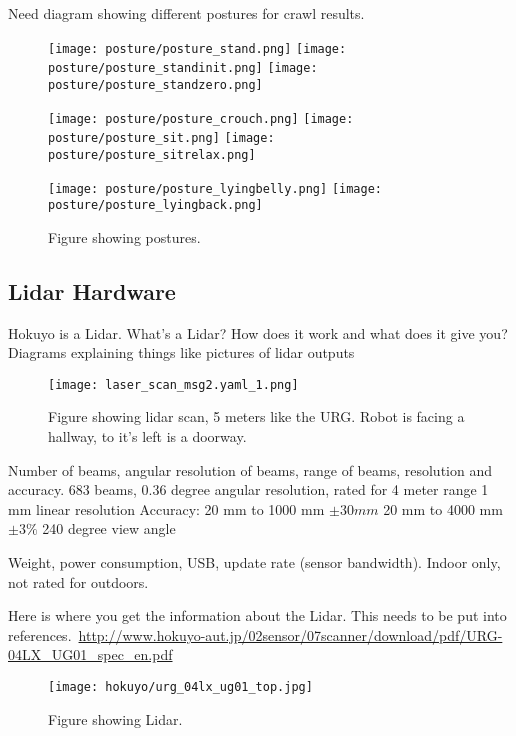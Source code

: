 Need diagram showing different postures for crawl results. 
\begin{figure}
\centerline{\texttt{[image: posture/posture\_stand.png]}
            \texttt{[image: posture/posture\_standinit.png]}
            \texttt{[image: posture/posture\_standzero.png]}
}
\vspace*{0.05in}
\centerline{\texttt{[image: posture/posture\_crouch.png]}
            \texttt{[image: posture/posture\_sit.png]}
            \texttt{[image: posture/posture\_sitrelax.png]}
}
\vspace*{0.05in}
\centerline{\texttt{[image: posture/posture\_lyingbelly.png]}
            \texttt{[image: posture/posture\_lyingback.png]}
}
\caption{Figure showing postures.}
\label{fig:nao_postures1}
\end{figure}

\subsection{Lidar Hardware}
Hokuyo is a Lidar. What's a Lidar? How does it work and what does it give you? 
{Diagrams explaining things like pictures of lidar outputs}

\begin{figure}
\centering
\texttt{[image: laser\_scan\_msg2.yaml\_1.png]}
\caption{Figure showing lidar scan, 5 meters like the URG\@.
         Robot is facing a hallway, to it's left is a doorway.}
\label{fig:lidar_scan1}
\end{figure}

Number of beams, angular resolution of beams, range of beams, resolution and accuracy.
683 beams, 0.36 degree angular resolution, rated for 4 meter range
1 mm linear resolution
Accuracy:
    20 mm to 1000 mm $\pm 30 mm$
    20 mm to 4000 mm $\pm 3\%$
240 degree view angle

Weight, power consumption, USB, update rate (sensor bandwidth).
Indoor only, not rated for outdoors.

Here is where you get the information about the Lidar. This needs to be put into
references.\
\url{http://www.hokuyo-aut.jp/02sensor/07scanner/download/pdf/URG-04LX_UG01_spec_en.pdf}

\begin{figure}
\centering
\texttt{[image: hokuyo/urg\_04lx\_ug01\_top.jpg]}
\caption{Figure showing Lidar.}
\label{fig:lidar_top1}
\end{figure}

